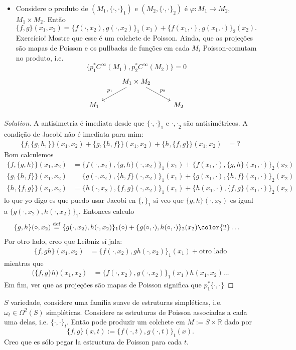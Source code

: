 \begin{example}
\begin{itemize}
\item  Considere o produto de \((M_1,\{\cdot ,\cdot \}_1)\) e \((M_2,\{ \cdot ,\cdot \}_2)\) é \(\varphi:M_1 \to M_2\), \(M_1 \times M_2\). Então
	\[\{f,g\}(x_1,x_2)=\{f(\cdot ,x_2),g(\cdot ,x_2)\}_1(x_1)+\{f(x_1,\cdot ),g(x_1,\cdot )\}_2(x_2).\]
	{\color{2}Exercício!} Mostre que esse é um colchete de Poisson. Ainda, que as projeções são mapas de Poisson e os pullbacks de funções em cada \(M_i\) Poisson-comutam no produto, i.e.
	\[\{p_1^*C^\infty(M_1),p_2^*C^\infty(M_2)\}=0\]
	\[\begin{tikzcd}
	&M_1 \times M_2\arrow[dl,"p_1",swap]\arrow[dr,"p_2"]\\
	M_1&&M_2
	\end{tikzcd}\]
\end{itemize}
\begin{proof}[Solution]\leavevmode
A antisimetria é imediata desde que \(\{\cdot ,\cdot \}_1\) e \({\cdot,\cdot}_2\) são antisimétricos. A condição de Jacobi não é imediata para mim:
\begin{align*}
	\{f,\{g,h,\}\}(x_1,x_2)+\{g,\{h,f\}\}(x_1,x_2)+\{h,\{f,g\}\}(x_1,x_2)&=?
\end{align*}
Bom calculemos
\begin{align*}
\{f,\{g,h\}\}(x_1,x_2)&=\{f(\cdot,x_2),\{g,h\}(\cdot,x_2)\}_1(x_1)+\{f(x_1,\cdot),\{g,h\}(x_1,\cdot)\}_2(x_2)\\
\{g,\{h,f\}\}(x_1,x_2)&=\{g(\cdot,x_2),\{h,f\}(\cdot,x_2)\}_1(x_1)+\{g(x_1,\cdot),\{h,f\}(x_1,\cdot)\}_2(x_2)\\
\{h,\{f,g\}\}(x_1,x_2)&=\{h(\cdot,x_2),\{f,g\}(\cdot,x_2)\}_1(x_1)+\{h(x_1,\cdot),\{f,g\}(x_1,\cdot)\}_2(x_2)
\end{align*}
lo que yo digo es que puedo usar Jacobi en \(\{,\}_1\) si veo que \(\{g,h\}(\cdot,x_2)\) es igual a \(\{g(\cdot,x_2),h(\cdot,x_2)\}_1\). Entonces calculo
\begin{align*}
\{g,h\}(\circ,x_2)&\overset{\operatorname{def}}{=}\{g(\cdot,x_2),h(\cdot,x_2)\}_1(\circ)+\{g(\circ,\cdot),h(\circ,\cdot)\}_2(x_2){\color{2}\ldots}
\end{align*}
Por otro lado, creo que Leibniz sí jala:
\begin{align*}
\{f,gh\}(x_1,x_2)&=\{f(\cdot,x_2),gh(\cdot,x_2)\}_1(x_1)+\text{otro lado}
\end{align*}
mientras que
\begin{align*}
\Big(\{f,g\}h\Big)(x_1,x_2)&=\{f(\cdot,x_2),g(\cdot,x_2)\}_1(x_1)h(x_1,x_2)\ldots
\end{align*}
Em fim, ver que as projeções são mapas de Poisson significa que \(p_1^*\{\cdot,\cdot\}\)
\end{proof}
\item \(S\) variedade, considere uma família suave de estruturas simpléticas, i.e. \(\omega_t \in \Omega^2(S)\) simpléticas. Considere as estruturas de Poisson associadas a cada uma delas, i.e. \(\{\cdot ,\cdot \}_t\). Então pode produzir um colchete em \(M:=S \times \mathbb{R}\) dado por
	\[\{f,g\}(x,t):=\{f(\cdot ,t),g(\cdot ,t)\}_t(x).\]
	Creo que es sólo pegar la estructura de Poisson para cada \(t\).
\end{example}

